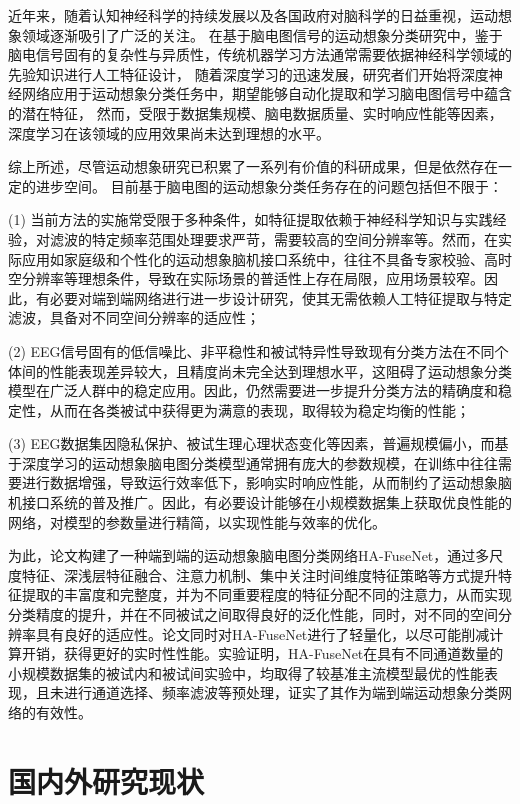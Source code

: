 近年来，随着认知神经科学的持续发展以及各国政府对脑科学的日益重视，运动想象领域逐渐吸引了广泛的关注。
在基于脑电图信号的运动想象分类研究中，鉴于脑电信号固有的复杂性与异质性，传统机器学习方法通常需要依据神经科学领域的先验知识进行人工特征设计，
随着深度学习的迅速发展，研究者们开始将深度神经网络应用于运动想象分类任务中，期望能够自动化提取和学习脑电图信号中蕴含的潜在特征，
然而，受限于数据集规模、脑电数据质量、实时响应性能等因素，深度学习在该领域的应用效果尚未达到理想的水平。

综上所述，尽管运动想象研究已积累了一系列有价值的科研成果，但是依然存在一定的进步空间。
目前基于脑电图的运动想象分类任务存在的问题包括但不限于：

(1) 当前方法的实施常受限于多种条件，如特征提取依赖于神经科学知识与实践经验，对滤波的特定频率范围处理要求严苛，需要较高的空间分辨率等。然而，在实际应用如家庭级和个性化的运动想象脑机接口系统中，往往不具备专家校验、高时空分辨率等理想条件，导致在实际场景的普适性上存在局限，应用场景较窄。因此，有必要对端到端网络进行进一步设计研究，使其无需依赖人工特征提取与特定滤波，具备对不同空间分辨率的适应性；

(2) EEG信号固有的低信噪比、非平稳性和被试特异性导致现有分类方法在不同个体间的性能表现差异较大，且精度尚未完全达到理想水平，这阻碍了运动想象分类模型在广泛人群中的稳定应用。因此，仍然需要进一步提升分类方法的精确度和稳定性，从而在各类被试中获得更为满意的表现，取得较为稳定均衡的性能；

(3) EEG数据集因隐私保护、被试生理心理状态变化等因素，普遍规模偏小，而基于深度学习的运动想象脑电图分类模型通常拥有庞大的参数规模，在训练中往往需要进行数据增强，导致运行效率低下，影响实时响应性能，从而制约了运动想象脑机接口系统的普及推广。因此，有必要设计能够在小规模数据集上获取优良性能的网络，对模型的参数量进行精简，以实现性能与效率的优化。

为此，论文构建了一种端到端的运动想象脑电图分类网络HA-FuseNet，通过多尺度特征、深浅层特征融合、注意力机制、集中关注时间维度特征策略等方式提升特征提取的丰富度和完整度，并为不同重要程度的特征分配不同的注意力，从而实现分类精度的提升，并在不同被试之间取得良好的泛化性能，同时，对不同的空间分辨率具有良好的适应性。论文同时对HA-FuseNet进行了轻量化，以尽可能削减计算开销，获得更好的实时性性能。实验证明，HA-FuseNet在具有不同通道数量的小规模数据集的被试内和被试间实验中，均取得了较基准主流模型最优的性能表现，且未进行通道选择、频率滤波等预处理，证实了其作为端到端运动想象分类网络的有效性。

\section{国内外研究现状}

